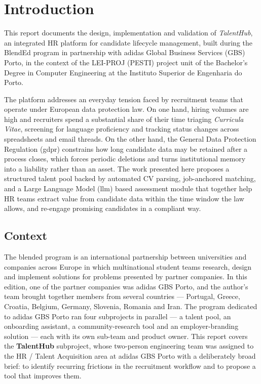 ﻿\chapter{Introduction}
\label{cap:introduction}

This report documents the design, implementation and validation of
\emph{TalentHub}, an integrated HR platform for candidate lifecycle
management, built during the BlendEd program in partnership with adidas
Global Business Services (GBS) Porto, in the context of the LEI-PROJ
(PESTI) project unit of the Bachelor's Degree in Computer Engineering at
the Instituto Superior de Engenharia do Porto.

The platform addresses an everyday tension faced by recruitment teams that
operate under European data protection law. On one hand, hiring volumes are
high and recruiters spend a substantial share of their time triaging
\textit{Curricula Vitae}, screening for language proficiency and tracking
status changes across spreadsheets and email threads. On the other hand,
the General Data Protection Regulation (\gls{gdpr}) constrains how long
candidate data may be retained after a process closes, which forces
periodic deletions and turns institutional memory into a liability rather
than an asset. The work presented here proposes a structured talent pool
backed by automated CV parsing, job-anchored matching, and a Large Language
Model (\gls{llm}) based assessment module that together help HR teams
extract value from candidate data within the time window the law allows,
and re-engage promising candidates in a compliant way.


\section{Context}
\label{sec:context}

The \gls{blended} program is an international partnership between universities and
companies across Europe in which multinational student teams research, design
and implement solutions for problems presented by partner companies. In this
edition, one of the partner companies was adidas GBS Porto, and the author's
team brought together members from several countries --- Portugal, Greece,
Croatia, Belgium, Germany, Slovenia, Romania and Iran. The program dedicated
to adidas GBS Porto ran four subprojects in parallel --- a talent pool, an
onboarding assistant, a community-research tool and an employer-branding
solution --- each with its own sub-team and product owner. This report covers the
\textbf{TalentHub} subproject, whose two-person engineering team was
assigned to the HR / Talent Acquisition area at adidas GBS Porto with a
deliberately broad brief: to identify recurring frictions in the recruitment
workflow and to propose a tool that improves them.

